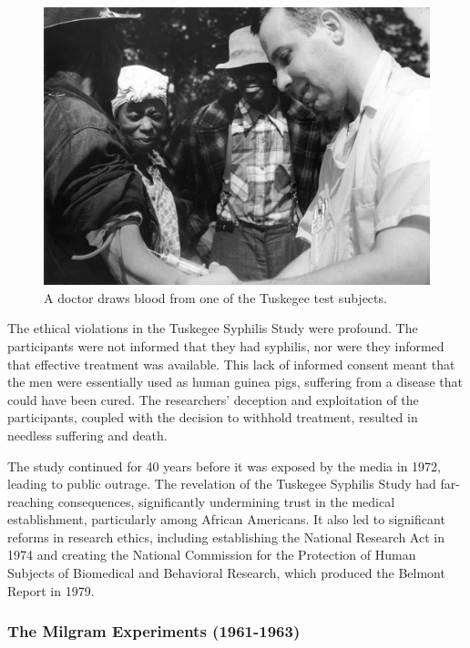 \documentclass[
]{book}
\begin{document}
\begin{figure}
\centering
\includegraphics[width=1\linewidth,height=\textheight,keepaspectratio]{images/Tuskegee-syphilis-study.jpg}
\caption{A doctor draws blood from one of the Tuskegee test subjects.}
\end{figure}

The ethical violations in the Tuskegee Syphilis Study were profound. The participants were not informed that they had syphilis, nor were they informed that effective treatment was available. This lack of informed consent meant that the men were essentially used as human guinea pigs, suffering from a disease that could have been cured. The researchers' deception and exploitation of the participants, coupled with the decision to withhold treatment, resulted in needless suffering and death.

The study continued for 40 years before it was exposed by the media in 1972, leading to public outrage. The revelation of the Tuskegee Syphilis Study had far-reaching consequences, significantly undermining trust in the medical establishment, particularly among African Americans. It also led to significant reforms in research ethics, including establishing the National Research Act in 1974 and creating the National Commission for the Protection of Human Subjects of Biomedical and Behavioral Research, which produced the Belmont Report in 1979.

\subsubsection*{The Milgram Experiments (1961-1963)}\label{the-milgram-experiments-1961-1963}
\end{document}
